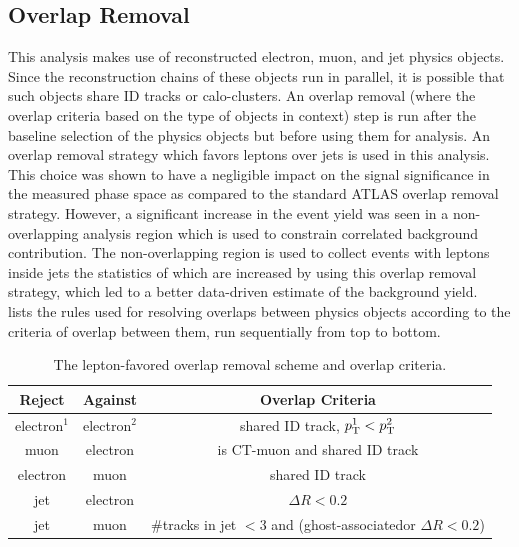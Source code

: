 \subsection{Overlap Removal}
This analysis makes use of reconstructed electron, muon, and jet physics objects. Since the reconstruction chains of these objects run in parallel, it is possible that such objects share ID tracks or calo-clusters. An overlap removal (where the overlap criteria based on the type of objects in context) step is run after the baseline selection of the physics objects but before using them for analysis. An overlap removal strategy which favors leptons over jets is used in this analysis. This choice was shown to have a negligible impact on the signal significance in the measured phase space as compared to the standard ATLAS overlap removal strategy. However, a significant increase in the event yield was seen in a non-overlapping analysis region which is used to constrain correlated background contribution. The non-overlapping region is used to collect events with leptons inside jets the statistics of which are increased by using this overlap removal strategy, which led to a better data-driven estimate of the background yield.~ lists the rules used for resolving overlaps between physics objects according to the criteria of overlap between them, run sequentially from top to bottom.

\begin{table}[!ht]
    \centering
    \begin{tabular}{ccc}
        \hline\hline
        Reject & Against & Overlap Criteria \\
        \hline
        electron$^1$ & electron$^2$ & shared ID track, $p_\mathrm{T}^1 < p_\mathrm{T}^2$ \\
        muon & electron & is CT-muon and shared ID track \\
        electron & muon & shared ID track \\
        jet & electron & $\Delta R<0.2$ \\
        jet & muon & \#tracks in jet $<$3 and (ghost-associated\footnotemark or $\Delta R<0.2$) \\
        \hline\hline
    \end{tabular}
    \caption{The lepton-favored overlap removal scheme and overlap criteria.}
    \label{tab:overlap_removal}
\end{table}

